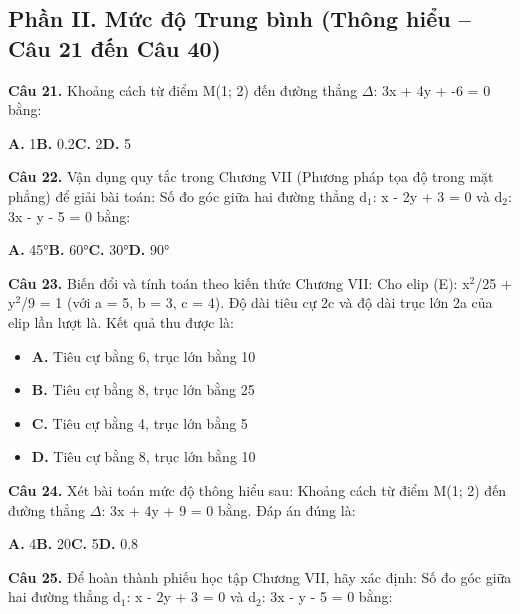 \documentclass[11pt,a4paper]{article}
\begin{document}
\subsection*{\color{accent} Phần II. Mức độ Trung bình (Thông hiểu -- Câu 21 đến Câu 40)}
\textbf{\color{primary} Câu 21.} Khoảng cách từ điểm M(1; 2) đến đường thẳng $\Delta$: 3x + 4y + -6 = 0 bằng:\par
\hspace*{1.5em}\textbf{A.} 1\quad\quad \textbf{B.} 0.2\quad\quad \textbf{C.} 2\quad\quad \textbf{D.} 5\par\vspace{2pt}
\textbf{\color{primary} Câu 22.} Vận dụng quy tắc trong Chương VII (Phương pháp tọa độ trong mặt phẳng) để giải bài toán: Số đo góc giữa hai đường thẳng d$_1$: x - 2y + 3 = 0 và d$_2$: 3x - y - 5 = 0 bằng:\par
\hspace*{1.5em}\textbf{A.} 45°\quad\quad \textbf{B.} 60°\quad\quad \textbf{C.} 30°\quad\quad \textbf{D.} 90°\par\vspace{2pt}
\textbf{\color{primary} Câu 23.} Biến đổi và tính toán theo kiến thức Chương VII: Cho elip (E): x$^2$/25 + y$^2$/9 = 1 (với a = 5, b = 3, c = 4). Độ dài tiêu cự 2c và độ dài trục lớn 2a của elip lần lượt là. Kết quả thu được là:\par
\begin{itemize}\setlength{\itemsep}{1pt}\setlength{\parskip}{0pt}
  \item[] \textbf{A.} Tiêu cự bằng 6, trục lớn bằng 10
  \item[] \textbf{B.} Tiêu cự bằng 8, trục lớn bằng 25
  \item[] \textbf{C.} Tiêu cự bằng 4, trục lớn bằng 5
  \item[] \textbf{D.} Tiêu cự bằng 8, trục lớn bằng 10
\end{itemize}\vspace{2pt}
\textbf{\color{primary} Câu 24.} Xét bài toán mức độ thông hiểu sau: Khoảng cách từ điểm M(1; 2) đến đường thẳng $\Delta$: 3x + 4y + 9 = 0 bằng. Đáp án đúng là:\par
\hspace*{1.5em}\textbf{A.} 4\quad\quad \textbf{B.} 20\quad\quad \textbf{C.} 5\quad\quad \textbf{D.} 0.8\par\vspace{2pt}
\textbf{\color{primary} Câu 25.} Để hoàn thành phiếu học tập Chương VII, hãy xác định: Số đo góc giữa hai đường thẳng d$_1$: x - 2y + 3 = 0 và d$_2$: 3x - y - 5 = 0 bằng:\par
\end{document}
